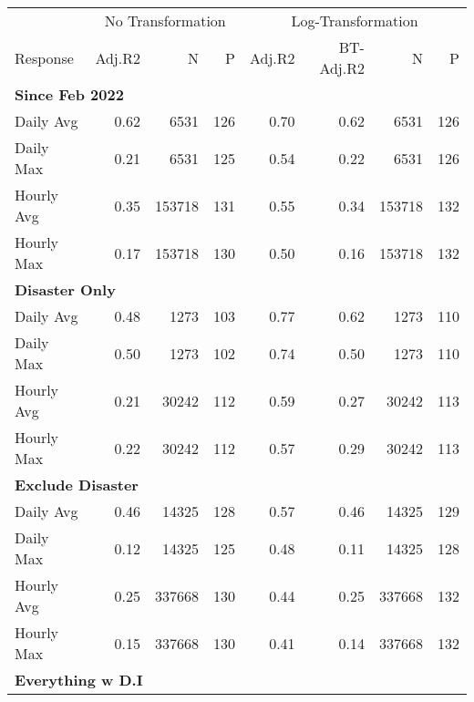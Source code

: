 
\begin{tabular}{l|r|r|r|r|r|r|r}
\hline
\multicolumn{1}{c|}{ } & \multicolumn{3}{c|}{No Transformation} & \multicolumn{4}{c}{Log-Transformation} \\
\cline{2-4} \cline{5-8}
Response & Adj.R2 & N & P & Adj.R2 & BT-Adj.R2 & N & P\\
\hline
\multicolumn{8}{l}{\textbf{Since Feb 2022}}\\
\hline
\hspace{1em}Daily Avg & 0.62 & 6531 & 126 & 0.70 & 0.62 & 6531 & 126\\
\hline
\hspace{1em}Daily Max & 0.21 & 6531 & 125 & 0.54 & 0.22 & 6531 & 126\\
\hline
\hspace{1em}Hourly Avg & 0.35 & 153718 & 131 & 0.55 & 0.34 & 153718 & 132\\
\hline
\hspace{1em}Hourly Max & 0.17 & 153718 & 130 & 0.50 & 0.16 & 153718 & 132\\
\hline
\multicolumn{8}{l}{\textbf{Disaster Only}}\\
\hline
\hspace{1em}Daily Avg & 0.48 & 1273 & 103 & 0.77 & 0.62 & 1273 & 110\\
\hline
\hspace{1em}Daily Max & 0.50 & 1273 & 102 & 0.74 & 0.50 & 1273 & 110\\
\hline
\hspace{1em}Hourly Avg & 0.21 & 30242 & 112 & 0.59 & 0.27 & 30242 & 113\\
\hline
\hspace{1em}Hourly Max & 0.22 & 30242 & 112 & 0.57 & 0.29 & 30242 & 113\\
\hline
\multicolumn{8}{l}{\textbf{Exclude Disaster}}\\
\hline
\hspace{1em}Daily Avg & 0.46 & 14325 & 128 & 0.57 & 0.46 & 14325 & 129\\
\hline
\hspace{1em}Daily Max & 0.12 & 14325 & 125 & 0.48 & 0.11 & 14325 & 128\\
\hline
\hspace{1em}Hourly Avg & 0.25 & 337668 & 130 & 0.44 & 0.25 & 337668 & 132\\
\hline
\hspace{1em}Hourly Max & 0.15 & 337668 & 130 & 0.41 & 0.14 & 337668 & 132\\
\hline
\multicolumn{8}{l}{\textbf{Everything w D.I}}\\

\end{tabular}
